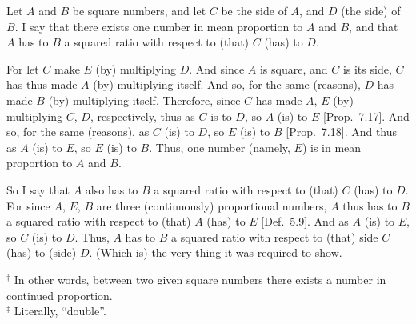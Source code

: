\begin{Parallel}{}{}
{\epsfysize=1.2in
\centerline{}

Let $A$ and $B$ be square numbers, and let $C$ be the side of $A$, and
$D$ (the side) of $B$. I say that there exists one number in mean proportion
to $A$ and $B$, and that $A$ has to $B$ a squared ratio with respect to
(that) $C$ (has) to $D$.

For let $C$ make $E$ (by) multiplying $D$. And since $A$ is square, and $C$ is its side, $C$ has thus made $A$ (by) multiplying
itself. And so, for the same (reasons), $D$ has made $B$ (by) multiplying
itself. Therefore, since $C$ has made  $A$, $E$ (by) multiplying
$C$, $D$, respectively, thus as $C$ is to $D$, so $A$ (is) to $E$ [Prop.~7.17]. And so, for the same (reasons), 
as $C$ (is) to $D$, so $E$ (is) to $B$  [Prop.~7.18]. And thus as $A$ (is) to $E$, so
$E$ (is) to $B$. Thus,  one  number (namely, $E$) is in mean proportion to $A$ and $B$.

So I say that $A$ also has to $B$ a squared ratio with respect to (that)
$C$ (has) to $D$. For since $A$, $E$, $B$ are  three (continuously) proportional numbers, $A$ thus has to $B$ a squared ratio with
respect to (that) $A$ (has) to $E$ [Def.~5.9]. And
as $A$ (is) to $E$, so $C$ (is) to $D$. Thus, $A$ has to $B$ a squared ratio
with respect to (that) side $C$ (has) to (side) $D$. (Which is) the very thing it
was required to show.}
\end{Parallel}
{\footnotesize\noindent$^\dag$ In other words, between two given square numbers there
exists a number in continued proportion.\\[0.5ex]
$^\ddag$ Literally, ``double''.}

